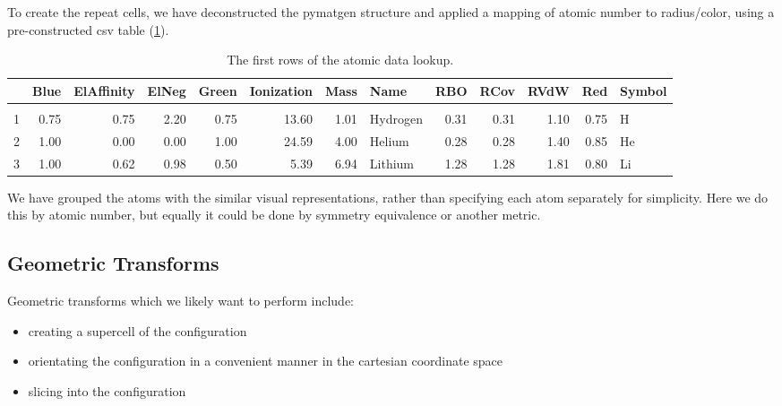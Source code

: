 \documentclass[10pt,parskip=half,
	toc=sectionentrywithdots,
	bibliography=totocnumbered,
	captions=tableheading,numbers=noendperiod]{scrartcl}
\providecommand{\tightlist}{%
  \setlength{\itemsep}{0pt}\setlength{\parskip}{0pt}}
\begin{document}
To create the repeat cells, we have deconstructed the pymatgen structure
and applied a mapping of atomic number to radius/color, using a
pre-constructed csv table (\cref{tbl:atom_map}).

    \begin{table}[H]\caption{The first rows of the atomic data lookup.}\label{tbl:atom_map}

\centering
\begin{adjustbox}{max width=\textwidth}
\begin{tabular}{lrrrrrrlrrrrl}
\toprule
{} &  Blue &  ElAffinity &  ElNeg &  Green &  Ionization &  Mass &      Name &   RBO &  RCov &  RVdW &   Red & Symbol \\
\midrule
  &       &             &        &        &             &       &           &       &       &       &       &        \\
1 &  0.75 &        0.75 &   2.20 &   0.75 &       13.60 &  1.01 &  Hydrogen &  0.31 &  0.31 &  1.10 &  0.75 &      H \\
2 &  1.00 &        0.00 &   0.00 &   1.00 &       24.59 &  4.00 &    Helium &  0.28 &  0.28 &  1.40 &  0.85 &     He \\
3 &  1.00 &        0.62 &   0.98 &   0.50 &        5.39 &  6.94 &   Lithium &  1.28 &  1.28 &  1.81 &  0.80 &     Li \\
\bottomrule
\end{tabular}

\end{adjustbox}
\end{table}

We have grouped the atoms with the similar visual representations,
rather than specifying each atom separately for simplicity. Here we do
this by atomic number, but equally it could be done by symmetry
equivalence or another metric.

\subsection{Geometric Transforms}\label{geometric-transforms}

Geometric transforms which we likely want to perform include:

\begin{itemize}
\tightlist
\item
  creating a supercell of the configuration
\item
  orientating the configuration in a convenient manner in the cartesian
  coordinate space
\item
  slicing into the configuration
\end{itemize}
\end{document}
